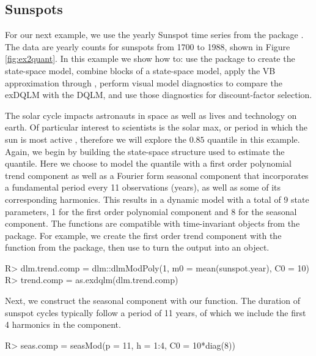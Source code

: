 \documentclass[jss]{jss}
\begin{document}
\subsection{Sunspots}
\label{sec:ex2}

For our next example, we use the yearly Sunspot time series from the package . The data are yearly counts for sunspots from 1700 to 1988, shown in Figure \ref{fig:ex2quant}. In this example we show how to: use the  package to create the state-space model, combine blocks of a state-space model, apply the VB approximation through , perform visual model diagnostics to compare the exDQLM with the DQLM, and use those diagnostics for discount-factor selection.

The solar cycle impacts astronauts in space as well as lives and technology on earth. Of particular interest to scientists is the solar max, or period in which the sun is most active \cite{sunspot}, therefore we will explore the $0.85$ quantile in this example. Again, we begin by building the state-space structure used to estimate the quantile. Here we choose to model the quantile with a first order polynomial trend component as well as a Fourier form seasonal component that incorporates a fundamental period every 11 observations (years), as well as some of its corresponding harmonics. This results in a dynamic model with a total of 9 state parameters, 1 for the first order polynomial component and 8 for the seasonal component. The  functions are compatible with time-invariant  objects from the  package. For example, we create the first order trend component with the function  from the  package, then use  to turn the output into an  object.
\begin{CodeChunk}
\begin{CodeInput}
R> dlm.trend.comp = dlm::dlmModPoly(1, m0 = mean(sunspot.year), C0 = 10)
R> trend.comp = as.exdqlm(dlm.trend.comp)
\end{CodeInput}
\end{CodeChunk}
Next, we construct the seasonal component with our  function. The duration of sunspot cycles typically follow a period of 11 years, of which we include the first 4 harmonics in the component.
\begin{CodeChunk}
\begin{CodeInput}
R> seas.comp = seasMod(p = 11, h = 1:4, C0 = 10*diag(8))
\end{CodeInput}
\end{CodeChunk}
\end{document}
